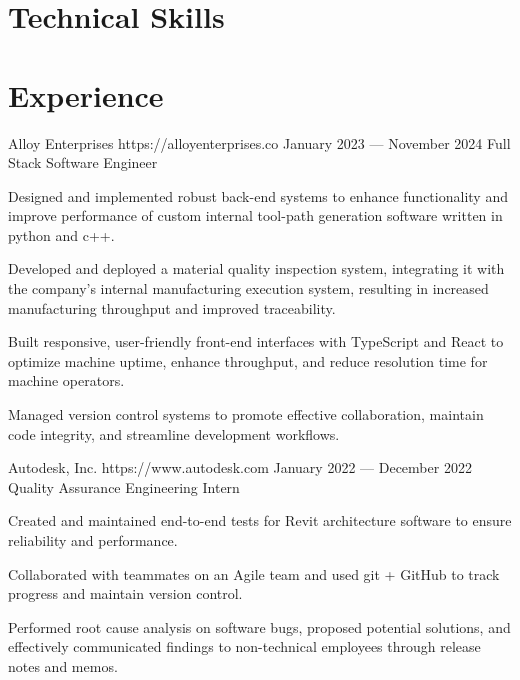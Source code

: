 \documentclass{resume}
\begin{document}
\smallskip

\section{Technical Skills}

\section{Experience}

\employer
    {Alloy Enterprises}
    {https://alloyenterprises.co}
    {January 2023 --- November 2024}
    {Full Stack Software Engineer}
    {\begin{jobitems}
        \item Designed and implemented robust back-end systems to enhance functionality and improve performance of custom internal tool-path generation software written in python and c++.
        \item Developed and deployed a material quality inspection system, integrating it with the company's internal manufacturing execution system, resulting in increased manufacturing throughput and improved traceability.
        \item Built responsive, user-friendly front-end interfaces with TypeScript and React to optimize machine uptime, enhance throughput, and reduce resolution time for machine operators.
        \item Managed version control systems to promote effective collaboration, maintain code integrity, and streamline development workflows.
    \end{jobitems}}

\employer
    {Autodesk, Inc.}
    {https://www.autodesk.com}
    {January 2022 --- December 2022}
    {Quality Assurance Engineering Intern}
    {\begin{jobitems}
        \item Created and maintained end-to-end tests for Revit architecture software to ensure reliability and performance.
        \item Collaborated with teammates on an Agile team and used git + GitHub to track progress and maintain version control.
        \item Performed root cause analysis on software bugs, proposed potential solutions, and effectively communicated findings to non-technical employees through release notes and memos.
    \end{jobitems}}
\end{document}
